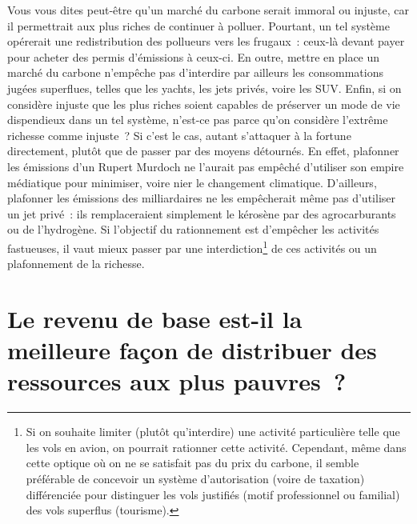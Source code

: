 \documentclass[a5paper,french,openany]{memoir}
\begin{document}
Vous vous dites peut-être qu'un marché du carbone serait immoral ou injuste, car il permettrait aux plus riches de continuer à polluer. Pourtant, un tel système opérerait une redistribution des pollueurs vers les frugaux~: ceux-là devant payer pour acheter des permis d'émissions à ceux-ci. En outre, mettre en place un marché du carbone n'empêche pas d'interdire par ailleurs les consommations jugées superflues, telles que les yachts, les jets privés, voire les SUV. Enfin, si on considère injuste que les plus riches soient capables de préserver un mode de vie dispendieux dans un tel système, n'est-ce pas parce qu'on considère l'extrême richesse comme injuste~? Si c'est le cas, autant s'attaquer à la fortune directement, plutôt que de passer par des moyens détournés. En effet, plafonner les émissions d'un Rupert Murdoch ne l'aurait pas empêché d'utiliser son empire médiatique pour minimiser, voire nier le changement climatique. D'ailleurs, plafonner les émissions des milliardaires ne les empêcherait même pas d'utiliser un jet privé~: ils remplaceraient simplement le kérosène par des agrocarburants ou de l'hydrogène. Si l'objectif du rationnement est d'empêcher les activités fastueuses, %
il vaut mieux passer par une interdiction\footnote{Si on souhaite limiter (plutôt qu'interdire) une activité particulière telle que les vols en avion, on pourrait rationner cette activité. Cependant, même dans cette optique où on ne se satisfait pas du prix du carbone, il semble préférable de concevoir un système d'autorisation (voire de taxation) différenciée pour distinguer les vols justifiés (motif professionnel ou familial) des vols superflus (tourisme). 
} de ces activités ou un plafonnement de la richesse.  %

\section*{\normalsize Le revenu de base est-il la meilleure façon de distribuer des ressources aux plus pauvres~?}\label{q:rdb}
\end{document}
